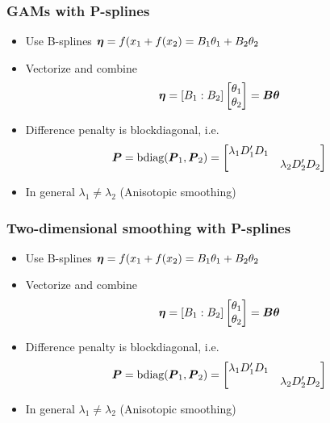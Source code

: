 \documentclass[11pt]{beamer}
\newcommand{\bfB}{\mbox{\boldmath $B$}}
\newcommand{\bfP}{\mbox{\boldmath $P$}}
\newcommand{\bfeta}{\mbox{\boldmath $\eta$}}
\newcommand{\bftheta}{\mbox{\boldmath $\theta$}}
\begin{document}


\begin{frame}[fragile]
\frametitle{GAMs with P-splines}
 \footnotesize
 \begin{itemize}
   \item Use B-splines $\bfeta = f(x_1 + f(x_2) = B_1\theta_1 + B_2 \theta_2$
   \item Vectorize and combine
    $$
       \bfeta =  [ B_1 : B_2 ] 
       \begin{bmatrix}
        \theta_1 \\
        \theta_2
       \end{bmatrix}
       =  \bfB \bftheta
    $$
    \item Difference penalty is blockdiagonal, i.e. 
    $$
    \bfP = \mbox{bdiag}(\bfP_1,\bfP_2) = 
     \begin{bmatrix}
        \lambda_1 D_1^\prime D_1 &      \\
                                 & \lambda_2 D_2^\prime D_2
     \end{bmatrix}
    $$
   \item In general $\lambda_1 \neq \lambda_2$ (Anisotopic smoothing)
 \end{itemize}
 
 \vfill
 
 \vfill
 
\end{frame}


\begin{frame}[fragile]
\frametitle{Two-dimensional smoothing with P-splines}
 \footnotesize
 \begin{itemize}
   \item Use B-splines $\bfeta = f(x_1 + f(x_2) = B_1\theta_1 + B_2 \theta_2$
   \item Vectorize and combine
    $$
       \bfeta =  [ B_1 : B_2 ] 
       \begin{bmatrix}
        \theta_1 \\
        \theta_2
       \end{bmatrix}
       =  \bfB \bftheta
    $$
    \item Difference penalty is blockdiagonal, i.e. 
    $$
    \bfP = \mbox{bdiag}(\bfP_1,\bfP_2) = 
     \begin{bmatrix}
        \lambda_1 D_1^\prime D_1 &      \\
                                 & \lambda_2 D_2^\prime D_2
     \end{bmatrix}
    $$
   \item In general $\lambda_1 \neq \lambda_2$ (Anisotopic smoothing)
 \end{itemize}
 
 \vfill
 
 \vfill
 
\end{frame}
\end{document}
